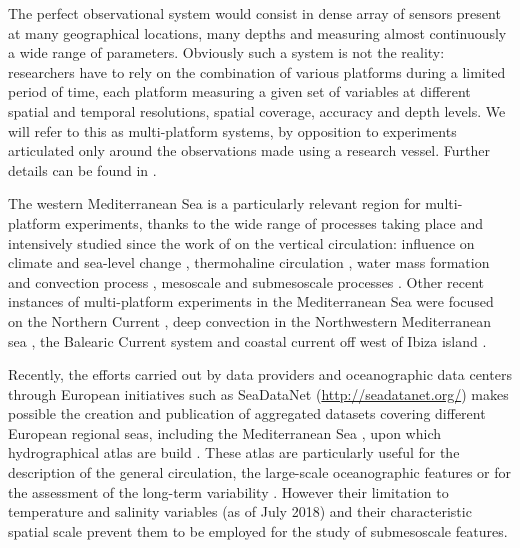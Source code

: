 \documentclass[essd,manuscript]{copernicus}
\begin{document}
The perfect observational system would consist in dense array of sensors present at many geographical locations, many depths and measuring almost continuously a wide range of parameters. Obviously such a system is not the reality: researchers have to rely on the combination of various platforms during a limited period of time, each platform measuring a given set of variables at different spatial and temporal resolutions, spatial coverage, accuracy and depth levels. We will refer to this as multi-platform systems, by opposition to experiments articulated only around the observations made using a research vessel. Further details can be found in \citet{TINTORE13}. 

The western Mediterranean Sea is a particularly relevant region for multi-platform experiments, thanks to the wide range of processes taking place and intensively studied since the work of \cite{WUST61} on the vertical circulation: influence on climate \citep[e.g.,][]{GIORGI06,GIORGI08,ADLOFF15,GUIOT16,RAHMSTORF98} and sea-level change \citep[e.g.,][]{TSIMPLIS02,BONADUCE16,WOLFF18}, thermohaline circulation \citep[e.g.,][]{BERGAMASCO10,MILLOT87,MILLOT91,MILLOT99,SKLIRIS14,ROBINSON01}, water mass formation and convection process \citep[e.g.,][]{MEDOC70,STOMMEL72,SEND1999,MACIAS18}, mesoscale \citep[e.g.,][]{ALVAREZ96,PINOT95,PUJOL05,SANCHEZROMAN17} and submesoscale processes \citep[e.g.,][]{BOSSE15,DAMIEN17,MARGIRIER17,TESTOR03,TESTOR18}. Other recent instances of multi-platform experiments in the Mediterranean Sea were focused on the Northern Current \citep[December 2011,][]{BERTA18}, deep convection in the Northwestern Mediterranean sea \citep[July 2012--October 2013,][]{TESTOR18}, the Balearic Current system \citep[July and November 2007, April and June 2008,][]{BOUFFARD10} and coastal current off west of Ibiza island \citep[August 2013,][]{TROUPIN15}.

Recently, the efforts carried out by data providers and oceanographic data centers through European initiatives such as SeaDataNet (\url{http://seadatanet.org/}) makes possible the creation and publication of aggregated datasets covering different European regional seas, including the Mediterranean Sea \citep{SIMONCELLI14}, upon which hydrographical atlas are build \citep[e.g.][]{SIMONCELLI16,IONA18a}. These atlas are particularly useful for the description of the general circulation, the large-scale oceanographic features or for the assessment of the long-term variability \citep{IONA18b}. However their limitation to temperature and salinity variables (as of July 2018) and their characteristic spatial scale prevent them to be employed for the study of submesoscale features.
\end{document}

